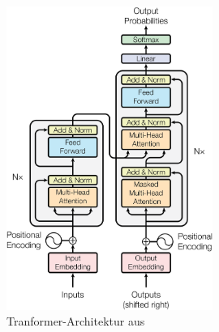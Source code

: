 \begin{figure}[ht]
	\centering
	\includegraphics[width=0.6\textwidth]{Bilder/ModalNet-21.png} 
	\caption{Tranformer-Architektur aus \cite[S. 3]{attention}}
	\label{fig:scaled-dot}
\end{figure}